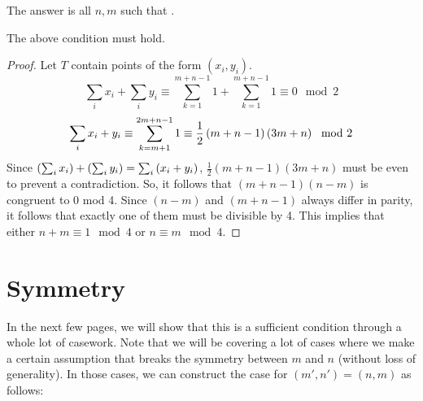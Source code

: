 \documentclass[10pt]{../usamts}
\begin{document}
\begin{solution}
The answer is all $n,m$ such that .

\begin{claim}
    The above condition must hold.
\end{claim}
\begin{proof}
    Let $T$ contain points of the form $(x_i,y_i)$.
    $$\sum_i x_i + \sum_i y_i \equiv \sum_{k=1}^{m+n-1} 1 + \sum_{k=1}^{m+n-1} 1 \equiv 0 \mod 2$$
    $$\sum_i x_i + y_i \equiv \sum_{k=m+1}^{2m+n-1} 1 \equiv \frac{1}{2} \left( m+n-1 \right)\left( 3m+n \right) \mod 2$$
    Since $\left( \sum_i x_i \right) + \left( \sum_i y_i \right) = \sum_i \left( x_i+y_i \right)$, $\frac{1}{2} (m+n-1)(3m+n)$ must be even to prevent a contradiction.
    So, it follows that $(m+n-1)(n-m)$ is congruent to 0 mod 4. Since $(n-m)$ and $(m+n-1)$ always differ in parity, it follows that exactly one of them must be divisible by 4. This implies that either $n+m \equiv 1 \mod 4$ or $n \equiv m \mod 4$.
\end{proof}

\newcommand{\mainaxis}{
    Select the points on the main axis so that each diagonal intersects exactly one point:
    \begin{enumerate}
        \item Select all the points of the form $(m, m+2k-1)$ for $1 \leq k \leq \floor{\frac{n}{2}}$
        \item Select all the points of the form $(m, m-2k)$ for $1 \leq k \leq \floor{\frac{m-1}{2}}$
        \item Select all the points of the form $(m+2k, m)$ for $1 \leq k \leq \floor{\frac{n-1}{2}}$
        \item Select all the points of the form $(m-2k+1, m)$ for $1 \leq k \leq \floor{\frac{m}{2}}$
    \end{enumerate}
}

\section*{Symmetry}

In the next few pages, we will show that this is a sufficient condition through a whole lot of casework. Note that we will be covering a lot of cases where we make a certain assumption that breaks the symmetry between $m$ and $n$ (without loss of generality). In those cases, we can construct the case for $(m',n') = (n,m)$ as follows:


\end{solution}
\end{document}
